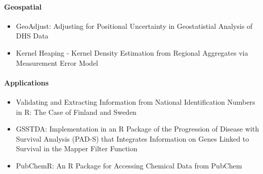 \hypertarget{geospatial}{%
\paragraph{Geospatial}\label{geospatial}}

\begin{itemize}
\tightlist
\item
  GeoAdjust: Adjusting for Positional Uncertainty in Geostatistial Analysis of DHS Data
\item
  Kernel Heaping - Kernel Density Estimation from Regional Aggregates via Measurement Error Model
\end{itemize}

\hypertarget{applications}{%
\paragraph{Applications}\label{applications}}

\begin{itemize}
\tightlist
\item
  Validating and Extracting Information from National Identification Numbers in R: The Case of Finland and Sweden
\item
  GSSTDA: Implementation in an R Package of the Progression of Disease with Survival Analysis (PAD-S) that Integrates Information on Genes Linked to Survival in the Mapper Filter Function
\item
  PubChemR: An R Package for Accessing Chemical Data from PubChem
\end{itemize}


\address{%
Mark P.J. van der Loo\\
Statistics Netherlands and Leiden University\\%
\\
%
\url{https://journal.r-project.org}\\%
%
\href{mailto:r-journal@r-project.org}{\nolinkurl{r-journal@r-project.org}}%
}
